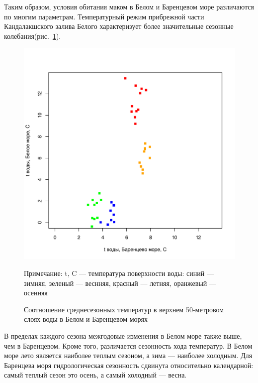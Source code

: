 Таким образом, условия обитания маком в Белом и Баренцевом море различаются по многим параметрам.
Температурный режим прибрежной части Кандалакшского залива Белого характеризует более значительные сезонные колебания(рис.~\ref{ris:temp_White_Barents}).
	\begin{figure}
    \includegraphics[width=\textwidth]{../temperatures_water_air/temp_White_Barents1.pdf}
    \caption{Соотношение среднесезонных температур в верхнем 50-метровом слоях воды в Белом и Баренцевом морях}

{\footnotesize Примечание: t, C --- температура поверхности воды: синий --- зимняя, зеленый --- веснняя, красный --- летняя, оранжевый --- осенняя}
    \label{ris:temp_White_Barents}
	\end{figure}
В пределах каждого сезона межгодовые изменения в Белом море также выше, чем в Баренцевом.
Кроме того, различается сезонность хода температур. 
В Белом море лето является наиболее теплым сезоном, а зима --- наиболее холодным.
Для Баренцева моря гидрологическая сезонность сдвинута относительно календарной: самый теплый сезон это осень, а самый холодный --- весна.

